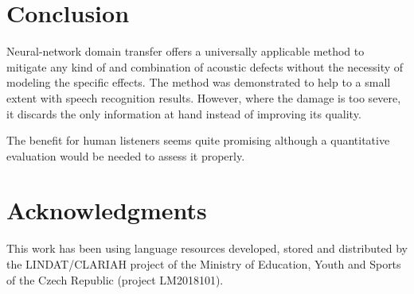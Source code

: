 \documentclass[runningheads,a4paper]{llncs}
\begin{document}
%
%
%
%
%

\section{Conclusion}

Neural-network domain transfer offers a universally applicable method to
mitigate any kind of and combination of acoustic defects without the necessity
of modeling the specific effects.
The method was demonstrated to help to a small extent with speech recognition
results. However, where the damage is too severe, it discards the only
information at hand instead of improving its quality.

The benefit for human listeners seems quite promising although a quantitative
evaluation would be needed to assess it properly.

\section*{Acknowledgments}

This work has been using language resources developed, stored and distributed by
the LINDAT/CLARIAH project of the Ministry of Education, Youth and Sports of the
Czech Republic (project LM2018101).




\end{document}
